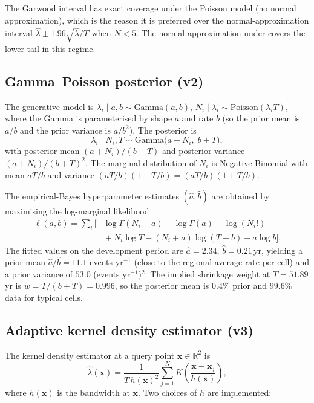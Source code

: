 \documentclass[10pt,a4paper,twocolumn]{article}
\begin{document}
The Garwood interval has exact coverage under the Poisson model (no normal approximation), which is the reason it is preferred over the normal-approximation interval $\hat\lambda \pm 1.96\sqrt{\hat\lambda/T}$ when $N<5$. The normal approximation under-covers the lower tail in this regime.

\subsection{Gamma--Poisson posterior (v2)}\label{app:gamma-poisson}

The generative model is $\lambda_i \mid a, b \sim \text{Gamma}(a, b)$, $N_i \mid \lambda_i \sim \text{Poisson}(\lambda_i T)$, where the Gamma is parameterised by shape $a$ and rate $b$ (so the prior mean is $a/b$ and the prior variance is $a/b^2$). The posterior is
\begin{equation}\label{eq:gamma-poisson-post}
\lambda_i \mid N_i, T \sim \text{Gamma}\bigl(a + N_i,\; b + T\bigr),
\end{equation}
with posterior mean $(a+N_i)/(b+T)$ and posterior variance $(a+N_i)/(b+T)^2$. The marginal distribution of $N_i$ is Negative Binomial with mean $aT/b$ and variance $(aT/b)(1 + T/b) = (aT/b)(1 + T/b)$.

The empirical-Bayes hyperparameter estimates $(\hat a, \hat b)$ are obtained by maximising the log-marginal likelihood
\begin{equation}\label{eq:eb-mll-appendix}
\begin{aligned}
\ell(a, b) = \sum_i \Big[ & \log\Gamma(N_i + a) - \log\Gamma(a) - \log(N_i!) \\
& {} + N_i \log T - (N_i + a)\log(T + b) + a \log b \Big].
\end{aligned}
\end{equation}
The fitted values on the development period are $\hat a = 2.34$, $\hat b = 0.21$\,yr, yielding a prior mean $\hat a / \hat b = 11.1$ events yr$^{-1}$ (close to the regional average rate per cell) and a prior variance of $53.0$ (events yr$^{-1}$)$^2$. The implied shrinkage weight at $T=51.89$\,yr is $w = T/(b+T) = 0.996$, so the posterior mean is $0.4\%$ prior and $99.6\%$ data for typical cells.

\subsection{Adaptive kernel density estimator (v3)}\label{app:kde}

The kernel density estimator at a query point $\mathbf{x}\in\mathbb{R}^2$ is
\begin{equation}\label{eq:kde-appendix}
\hat\lambda(\mathbf{x}) = \frac{1}{T\, h(\mathbf{x})^2} \sum_{j=1}^{N} K\!\left( \frac{\mathbf{x} - \mathbf{x}_j}{h(\mathbf{x})} \right),
\end{equation}
where $h(\mathbf{x})$ is the bandwidth at $\mathbf{x}$. Two choices of $h$ are implemented:
\end{document}
